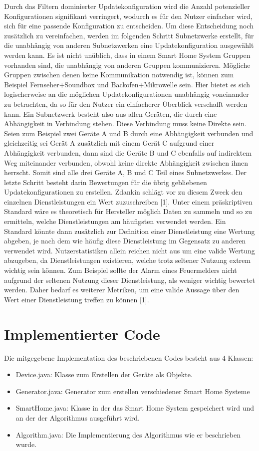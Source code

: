 Durch das Filtern dominierter Updatekonfiguration wird die Anzahl potenzieller Konfigurationen signifikant verringert, wodurch es für den Nutzer einfacher wird, sich
für eine passende Konfiguration zu entscheiden. Um diese Entscheidung noch zusätzlich zu vereinfachen, werden im folgenden Schritt Subnetzwerke erstellt, für die
unabhängig von anderen Subnetzwerken eine Updatekonfiguration ausgewählt werden kann. Es ist nicht unüblich, dass in einem Smart Home System Gruppen vorhanden
sind, die unabhängig von anderen Gruppen kommunizieren. Mögliche Gruppen zwischen denen keine Kommunikation notwendig ist, können zum Beispiel Fernseher+Soundbox
und Backofen+Mikrowelle sein. Hier bietet es sich logischerweise an die möglichen Updatekonfigurationen unabhängig voneinander zu betrachten, da so für
den Nutzer ein einfacherer Überblick verschafft werden kann. 
Ein Subnetzwerk besteht also aus allen Geräten, die durch eine Abhängigkeit
in Verbindung stehen. Diese Verbindung muss keine Direkte sein. Seien zum Beispiel zwei Geräte A und B durch eine Abhängigkeit verbunden und gleichzeitig sei Gerät
A zusätzlich mit einem Gerät C aufgrund einer Abhängigkeit verbunden, dann sind die Geräte B und C ebenfalls auf indirektem Weg miteinander verbunden, obwohl
keine direkte Abhängigkeit zwischen ihnen herrscht. Somit sind alle drei Geräte A, B und C Teil eines Subnetzwerkes.
Der letzte Schritt besteht darin Bewertungen für die übrig gebliebenen Updatekonfigurationen zu erstellen. Zdankin schlägt vor zu diesem Zweck den einzelnen Dienstleistungen ein
Wert zuzuschreiben [1]. Unter einem präskriptiven Standard wäre es theoretisch für Hersteller möglich Daten zu sammeln und so zu ermitteln, welche Dienstleistungen am 
häufigsten verwendet werden. Ein Standard könnte dann zusätzlich zur Definition einer Dienstleistung eine Wertung abgeben, je nach dem wie häufig diese Dienstleistung 
im Gegensatz zu anderen verwendet wird. Nutzerstatistiken allein reichen nicht aus um eine valide Wertung abzugeben, da Dienstleistungen existieren, welche trotz
seltener Nutzung extrem wichtig sein können. Zum Beispiel sollte der Alarm eines Feuermelders nicht aufgrund der seltenen Nutzung dieser Dienstleistung, als weniger wichtig
bewertet werden. Daher bedarf es weiterer Metriken, um eine valide Aussage über den Wert einer Dienstleistung treffen zu können [1].

\section{Implementierter Code}
Die mitgegebene Implementation des beschriebenen Codes besteht aus 4 Klassen:
\begin{itemize}
\item Device.java: Klasse zum Erstellen der Geräte als Objekte.
\item Generator.java: Generator zum erstellen verschiedener Smart Home Systeme
\item SmartHome.java: Klasse in der das Smart Home System gespeichert wird und an der der Algorithmus ausgeführt wird.
\item Algorithm.java: Die Implementierung des Algorithmus wie er beschrieben wurde.
\end{itemize}

